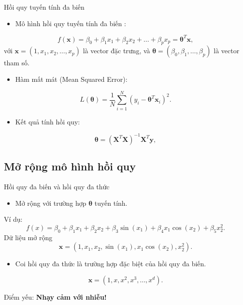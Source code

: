 \begin{frame}{Hồi quy tuyến tính đa biến}

    \begin{itemize}
        \item Mô hình hồi quy tuyến tính đa biến \cite{VHTiep2020}:
    \end{itemize}
    \begin{equation}
        f(\mathbf{x}) = \beta_0 + \beta_1 x_1 + \beta_2 x_2 + \ldots + \beta_p x_p = \boldsymbol{\theta}^T \mathbf{x},
    \end{equation}
    với \(\mathbf{x} = (1, x_1, x_2, \ldots, x_p)\) là vector đặc trưng, và \(\boldsymbol{\theta} = (\beta_0, \beta_1, \ldots, \beta_p)\) là vector tham số.
    \begin{itemize}
        \item Hàm mất mát (Mean Squared Error):
    \end{itemize}
    \begin{equation}
        L(\boldsymbol{\theta}) = \frac{1}{N} \sum_{i=1}^{N} (y_i - \boldsymbol{\theta}^T \mathbf{x}_i)^2.
    \end{equation}
    \begin{itemize}
        \item Kết quả tính hồi quy:
    \end{itemize}
    \begin{equation}
        \boldsymbol{\theta} = (\mathbf{X}^T \mathbf{X})^{-1} \mathbf{X}^T \mathbf{y},
    \end{equation}

\end{frame}

\subsection{Mở rộng mô hình hồi quy}

\begin{frame}{Hồi quy đa biến và hồi quy đa thức}
    \begin{itemize}
        \item Mở rộng với trường hợp \(\boldsymbol{\theta}\) tuyến tính.
    \end{itemize}
    Ví dụ:
    \begin{equation}
        f(x) = \beta_0 + \beta_1 x_1 + \beta_2 x_2 + \beta_3 \sin (x_1) + \beta_4 x_1 \cos (x_2) + \beta_5 x_2^2.
    \end{equation}
    Dữ liệu mở rộng 
    \begin{equation}
        \mathbf{x} = (1, x_1, x_2, \sin (x_1), x_1 \cos (x_2), x_2^2).
    \end{equation}

    \begin{itemize}
        \item Coi hồi quy đa thức là trường hợp đặc biệt của hồi quy đa biến.
    \end{itemize}
    \begin{equation}
        \mathbf{x} = (1, x, x^2, x^3, \ldots, x^d).
    \end{equation}

    Điểm yếu: \textbf{Nhạy cảm với nhiễu!}
\end{frame}

